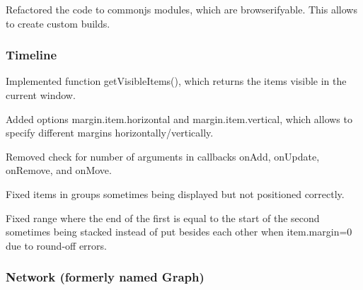 \begin{DoxyItemize}
\item Refactored the code to commonjs modules, which are browserifyable. This allows to create custom builds.
\end{DoxyItemize}

\subsubsection*{Timeline}


\begin{DoxyItemize}
\item Implemented function {\ttfamily get\+Visible\+Items()}, which returns the items visible in the current window.
\item Added options {\ttfamily margin.\+item.\+horizontal} and {\ttfamily margin.\+item.\+vertical}, which allows to specify different margins horizontally/vertically.
\item Removed check for number of arguments in callbacks {\ttfamily on\+Add}, {\ttfamily on\+Update}, {\ttfamily on\+Remove}, and {\ttfamily on\+Move}.
\item Fixed items in groups sometimes being displayed but not positioned correctly.
\item Fixed range where the {\ttfamily end} of the first is equal to the {\ttfamily start} of the second sometimes being stacked instead of put besides each other when {\ttfamily item.\+margin=0} due to round-\/off errors.
\end{DoxyItemize}

\subsubsection*{Network (formerly named Graph)}


